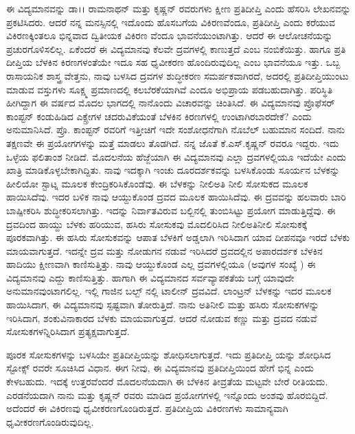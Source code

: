 ಈ ವಿದ್ಯಮಾನವನ್ನು ಡಾ।। ರಾಮನಾಥನ್ ಮತ್ತು ಕೃಷ್ಣನ್ ರವರುಗಳು ಕ್ಷೀಣ ಪ್ರತಿದೀಪ್ತಿ ಎಂದು ಹೆಸರಿಸಿ ಲೇಖನವನ್ನು ಪ್ರಕಟಿಸಿದರು. ಆದರೆ ನನ್ನ ಮನಸ್ಸಿನಲ್ಲಿ ಇದೊಂದು ಹೊಸಬಗೆಯ ವಿಕಿರಣವೆಂದೂ, ಪ್ರತಿದೀಪ್ತಿ ಎಂದು ಕರೆಯುವ ವಿಕಿರಣಕ್ಕಿಂತಲೂ ಭಿನ್ನವಾದ ದ್ವಿತೀಯಕ ವಿಕಿರಣ\-
ವೆಂದೂ ಭಾವನೆಯುಂಟಾಗಿತ್ತು. ಆದರೆ ಈ ಆಲೋಚನೆಯನ್ನು ಪ್ರಚುರಗೊಳಿಸಲಿಲ್ಲ. ಏಕೆಂದರೆ ಈ ವಿದ್ಯಮಾನವು ಕೆಲವೇ ದ್ರವಗಳಲ್ಲಿ ಕಾಣುತ್ತದೆ ಎಂಬ ನಂಬಿಕೆಯಿತ್ತು. ಹಾಗೂ ಪ್ರತಿ ದೀಪ್ತಿಯ ಬೆಳಕಿನ ಕಿರಣಗಳಂತೆಯೇ ಇದೂ ಸಹ ಧೃವೀಕರಣ ಹೊಂದಿರುವುದಿಲ್ಲ ಎಂಬ ಭಾವನೆಯೂ ಇತ್ತು. ಒಬ್ಬ ರಾಸಾಯನಿಕ ಶಾಸ್ತ್ರ ವೇತ್ತನು, ನಾವು ಬಳಸಿದ ದ್ರವಗಳ ಶುದ್ಧೀಕರಣ ಸಮರ್ಪಕವಾಗಿರದೆ, ಅದರಲ್ಲಿ ಪ್ರತಿದೀಪ್ತಿಯುಂಟು ಮಾಡುವ ವಸ್ತುಗಳು ಸೂಕ್ಷ್ಮ ಪ್ರಮಾಣದಲ್ಲಿ ಕಲಬೆರಕೆಯಾಗಿವೆ ಎಂದೂ ಅಭಿಪ್ರಾಯ ಪಡಬಹುದಾಗಿತ್ತು. ಪರಿಸ್ಥಿತಿ ಹೀಗಿದ್ದಾಗ ಈ ವರ್ಷದ ಮೊದಲ ಭಾಗದಲ್ಲಿ ನಾನೊಂದು ವಿಚಾರವನ್ನು ಚಿಂತಿಸಿದೆ. ಈ ವಿದ್ಯಮಾನವು ಪ್ರೊಫೆಸರ್ ಕಾಂಪ್ಟನ್ ಕಂಡುಹಿಡಿದ ಎಕ್ಸ್\enginline{-}ರೇಗಳ ಚದರುವಿಕೆಯಂತೆ ಬೆಳಕಿನ ಕಿರಣಗಳಲ್ಲಿ ಉಂಟಾಗಿರಬಾರದೇಕೆ? ಎಂದು ಅನುಮಾನಿಸಿದೆ. ಪ್ರೊ. ಕಾಂಪ್ಟನ್ ರವರಿಗೆ ಇತ್ತೀಚಿಗೆ ಇದೇ ಸಂಶೋಧನೆಗಾಗಿ ನೊಬೆಲ್ ಬಹುಮಾನ ಸಂದಿದೆ. ನಾನು ತಕ್ಷಣವೇ ಈ ಪ್ರಯೋಗಗಳನ್ನು ಮತ್ತೆ ಮಾಡಲು ತೊಡಗಿದೆ. ನನ್ನ ಜೊತೆ ಕೆ.ಎಸ್.ಕೃಷ್ಣನ್ ರವರೂ ಇದ್ದರು. ಇದು ಒಳ್ಳೆಯ ಫಲಿತಾಂಶ ನೀಡಿದೆ. ಮೊದಲನೆಯ ಹೆಜ್ಜೆಯಾಗಿ ಈ ವಿದ್ಯಮಾನವು ಎಲ್ಲಾ ದ್ರವಗಳಲ್ಲಿಯೂ ಇದೆಯೇ ಎಂದು ಖಾತ್ರಿ ಮಾಡಿಕೊಳ್ಳಬೇಕಾಗಿದ್ದಿತು. ನಾವು ಇದಕ್ಕಾಗಿ  ಇಂಚು ದೂರದರ್ಶಕವನ್ನು ಬಳಸಿಕೊಂಡು ಸೂರ್ಯನ ಬೆಳಕನ್ನು ಹೀಲಿಯೋ ಸ್ಟಾಟ್ನ ಮೂಲಕ ಕೇಂದ್ರಿಕರಿಸಿಕೊಂಡೆವು. ಈ ಬೆಳಕನ್ನು ನೀಲಿ\enginline{-}ಅತಿ ನೀಲಿ ಸೋಸುಕದ ಮೂಲಕ ಹಾಯಿಸಿದೆವು. ಇದರ ಬಳಿಕ ನಾವು ಆಯ್ದುಕೊಂಡ ದ್ರವದ ಮೂಲಕ ಹಾಯಿಸಿದೆವು. ಈ ದ್ರವವನ್ನು ಹಲವಾರು ಬಾರಿ ಬಾಷ್ಪೀಕರಿಸಿ ಶುದ್ಧೀಕರಿಸಲಾಗಿತ್ತು. ಇದನ್ನು ನಿರ್ವಾತವಿರುವ ಬಲ್ಬಿನಲ್ಲಿ ತುಂಬಿಸಿಟ್ಟು ಪ್ರಯೋಗ ಮಾಡುತ್ತಿದ್ದೆವು. ಈ ದ್ರವದಿಂದ ಹಾಯ್ದು ಬೆಳಕು ಹರಿಯುವ, ಹಸಿರು ಸೋಸುಕವು ಮೊದಲಿರಿಸಿದ ನೀಲಿ\enginline{-}ಅತಿನೀಲಿ ಸೋಸುಕಕ್ಕೆ ಪೂರಕವಾಗಿತ್ತು. ಈ ಹಸಿರು ಸೋಸುಕವನ್ನು ಆಪಾತ ಬೆಳಕಿಗೆ ಅಡ್ಡಲಾಗಿ ಇರಿಸಿದಾಗ ಯಾವ ದೀಪನವೂ ಇರದೆ ಬೆಳಕು ಮಾಯವಾಗುತ್ತದೆ. ಇದನ್ನೇ ದ್ರವ ಮತ್ತು ನೋಡುಗನ ನಡುವೆ ಇರಿಸಿದರೆ ದ್ರವದಲ್ಲಿನ ಅಪಾರದರ್ಶಕ ಬೆಳಕಿನ ಹಾದಿಯು ಕ್ಷೀಣವಾಗಿ ಕಾಣಿಸುತ್ತಿತ್ತು. ನಾವು ಆಯ್ದುಕೊಂಡ ಎಲ್ಲ ದ್ರವಗಳಲ್ಲಿಯೂ (ಅವುಗಳ ಸಂಖ್ಯೆ ) ಈ ವಿದ್ಯಮಾನವು ಎದ್ದು ಕಾಣಿಸುತ್ತಿತ್ತು. ಹಾಗಾಗಿ ಈ ವಿದ್ಯಮಾನದ ಸರ್ವವ್ಯಾಪಕತೆಯ ಬಗ್ಗೆ ಯಾವುದೇ ಅನುಮಾನವುಂಟಾಗಲಿಲ್ಲ. ಇಲ್ಲಿ ಗಾಜಿನ ಬಲ್ಬ್ ನಲ್ಲಿ ಟಾಲೀನ್ ದ್ರವವಿದೆ. ಲಾಂಟ್ರನ್ ಬೆಳಕನ್ನು ಇದರ ಮೂಲಕ ಹಾಯಿಸಿದಾಗ, ಈ ವಿದ್ಯಮಾನವು ಸ್ಪಷ್ಟವಾಗಿ ತೋರುತ್ತಿದೆ. ನಾನು ಅತಿನೀಲಿ ಮತ್ತು ಹಸಿರು ಸೋಸುಕಗಳನ್ನು ಇರಿಸಿದಾಗ, ಶಂಕುವಿನಾಕಾರದ ಬೆಳಕು ಮಾಯವಾಗುತ್ತದೆ. ಆದರೆ ನೋಡುವ ಕಣ್ಣು ಮತ್ತು ದ್ರವದ ನಡುವೆ ಸೋಸುಕಗಳನ್ನಿರಿಸಿದಾಗ ಪ್ರತ್ಯಕ್ಷವಾಗುತ್ತದೆ.

ಪೂರಕ ಸೋಸುಕಗಳನ್ನು ಬಳಸಿಯೇ ಪ್ರತಿದೀಪ್ತಿಯನ್ನು ಶೋಧಿಸಲಾಗುತ್ತದೆ. ಇದು ಪ್ರತಿದೀಪ್ತಿ\-
ಯನ್ನು ಶೋಧಿಸಿದ ಸ್ಟೋಕ್ಸ್ ರವರೇ ಸೂಚಿಸಿದ ವಿಧಾನ. ಈಗ ನೀವು, ಈ ವಿದ್ಯಮಾನವು ಪ್ರತಿದೀಪ್ತಿಯಿಂದ ಹೇಗೆ ಭಿನ್ನ ಎಂದು ಕೇಳಬಹುದು. ಇದಕ್ಕೆ ಉತ್ತರವೆಂದರೆ\enginline{-} ಮೊದಲನೆಯದಾಗಿ ಈ ಬೆಳಕಿನ ತೀವ್ರತೆಯ ಮಟ್ಟವೇ ಬೇರೆ ರೀತಿಯದು. ಎರಡನೆಯದಾಗಿ ನಾನು ಮತ್ತು ಕೃಷ್ಣನ್ ರವರು ಮಾಡಿದ ಪ್ರಯೋಗಗಳಲ್ಲಿ ಇನ್ನೊಂದು ಅಂಶವು ಹೊರಬಿದ್ದಿದೆ. ಅದೆಂದರೆ ಈ ವಿಕಿರಣವು ಧೃವೀಕರಣಗೊಂಡಿರುತ್ತದೆ. ಪ್ರತಿದೀಪ್ತಿಯ ವಿಕಿರಣಗಳು ಸಾಮಾನ್ಯವಾಗಿ ಧೃವೀಕರಣಗೊಂಡಿರು\-ವುದಿಲ್ಲ.

